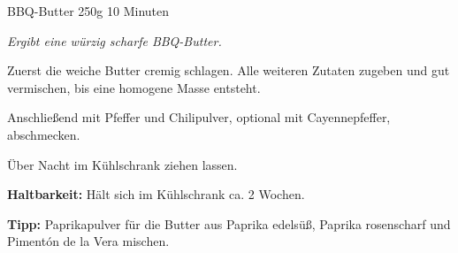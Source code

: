 \begin{recipe}{BBQ-Butter} {250g} {10 Minuten}

\freeform
\textit{Ergibt eine würzig scharfe BBQ-Butter.}


Zuerst die weiche Butter cremig schlagen.
Alle weiteren Zutaten zugeben und gut vermischen, bis eine homogene Masse entsteht.


Anschließend mit Pfeffer und Chilipulver, optional mit Cayennepfeffer, abschmecken.

\newstep
Über Nacht im Kühlschrank ziehen lassen.

\freeform
\hrulefill

\freeform 
\textbf{Haltbarkeit:}
Hält sich im Kühlschrank ca. 2 Wochen.

\freeform 
\textbf{Tipp:}
Paprikapulver für die Butter aus Paprika edelsüß, Paprika rosenscharf und Pimentón de la Vera mischen.

\end{recipe}
